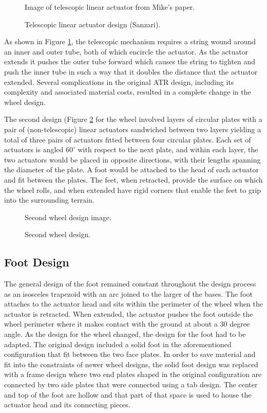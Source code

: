 \documentclass[11pt]{article}
\numberwithin{figure}{section}
\begin{document}
\begin{multicols}{2}
\begin{figure}[H]
Image of telescopic linear actuator from Mike's paper.
\caption{Telescopic linear actuator design (Sanzari).}
\label{fig:telescopic-actuator-design}
\end{figure}

As shown in Figure \ref{fig:telescopic-actuator-design}, the telescopic mechanism requires a string wound around an inner and outer tube, both of which encircle the actuator. As the actuator extends it pushes the outer tube forward which causes the string to tighten and push the inner tube in such a way that it doubles the distance that the actuator extended. Several complications in the original ATR design, including its complexity and associated material costs, resulted in a complete change in the wheel design. 

The second design (Figure \ref{fig:second-wheel-design} for the wheel involved layers of circular plates with a pair of (non-telescopic) linear actuators sandwiched between two layers yielding a total of three pairs of actuators fitted between four circular plates. Each set of actuators is angled $60^\circ$ with respect to the next plate, and within each layer, the two actuators would be placed in opposite directions, with their lengths spanning the diameter of the plate. A foot would be attached to the head of each actuator and fit between the plates. The feet, when retracted, provide the surface on which the wheel rolls, and when extended have rigid corners that enable the feet to grip into the surrounding terrain.

\begin{figure}[H]
Second wheel design image.
\caption{Second wheel design.}
\label{fig:second-wheel-design}
\end{figure}

\subsection{Foot Design}
The general design of the foot remained constant throughout the design process as an isosceles trapezoid with an arc joined to the larger of the bases. The foot attaches to the actuator head and sits within the perimeter of the wheel when the actuator is retracted. When extended, the actuator pushes the foot outside the wheel perimeter where it makes contact with the ground at about a 30 degree angle. As the design for the wheel changed, the design for the foot had to be adapted. The original design included a solid foot in the aforementioned configuration that fit between the two face plates. In order to save material and fit into the constraints of newer wheel designs, the solid foot design was replaced with a frame design where two end plates shaped in the original configuration are connected by two side plates that were connected using a tab design. The center and top of the foot are hollow and that part of that space is used to house the actuator head and its connecting pieces. 


\end{multicols}
\end{document}
